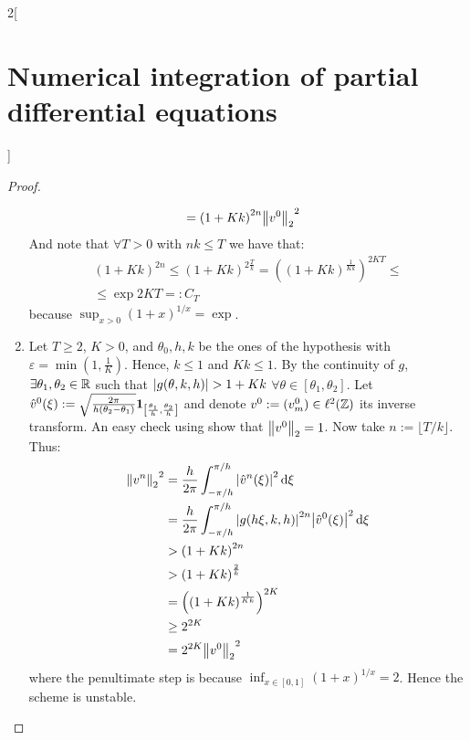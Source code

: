 \documentclass[../../../main_math.tex]{subfiles}
\begin{document}
\begin{multicols}{2}[\section{Numerical integration of partial differential equations}]
\begin{proof}
\begin{enumerate}
\begin{align*}
                                 & ={(1+Kk)}^{2n} {\left\|{v}^0\right\|_2}^2
            \end{align*}
            And note that $\forall T>0$ with $nk\leq T$ we have that:
            \begin{multline*}
              {(1+Kk)}^{2n}\leq{(1+Kk)}^{2\frac{T}{k}}={\left({(1+Kk)}^\frac{1}{Kk}\right)}^{2 K T}\leq\\\leq \exp{2K T}=:C_T
            \end{multline*}
            because $\sup_{x>0}{(1+x)}^{1/x}=\exp{}$.
      \item Let $T\geq 2$, $K>0$, and $\theta_0,h,k$ be the ones of the hypothesis with $\varepsilon=\min(1,\frac{1}{K})$. Hence, $k\leq 1$ and $Kk\leq 1$. By the continuity of $g$, $\exists \theta_1,\theta_2\in\mathbb{R}$ such that $\abs{g(\theta, k,h)}>1+Kk$ $\forall\theta\in[\theta_1,\theta_2]$. Let $\hat{v}^0(\xi):=\sqrt{\frac{2\pi}{h(\theta_2-\theta_1)}}\boldsymbol{\mathrm{1}}_{\left[\frac{\theta_1}{h},\frac{\theta_2}{h}\right]}$ and denote $v^0:=(v_m^0)\in\ell^2(\mathbb{Z})$ its inverse transform. An easy check using show that $\left\|v^0\right\|_2=1$. Now take $n:=\lfloor T/k \rfloor$. Thus:
            \begin{align*}
              {\left\|v^n\right\|_2}^2 & =\frac{h}{2\pi}\int_{-\pi/h}^{\pi/h} \abs{\hat{v}^n(\xi)}^2\dd{\xi}                        \\
                               & =\frac{h}{2\pi}\int_{-\pi/h}^{\pi/h} \abs{g(h\xi, k,h)}^{2n}\abs{\hat{v}^0(\xi)}^2\dd{\xi} \\
                               & >{(1+Kk)}^{2n}                                                                             \\
                               & >{(1+Kk)}^{\frac{2}{k}}                                                                    \\
                               & ={\left({(1+Kk)}^{\frac{1}{Kk}}\right)}^{2K}                                               \\
                               & \geq 2^{2K}                                                                                \\
                               & =2^{2K}{\left\|v^0\right\|_2}^2
            \end{align*}
            where the penultimate step is because $\inf_{x\in[0,1]}{(1+x)}^{1/x}=2$.
            Hence the scheme is unstable.
    \end{enumerate}
  \end{proof}
  \begin{corollary}

\end{corollary}
\end{multicols}
\end{document}
